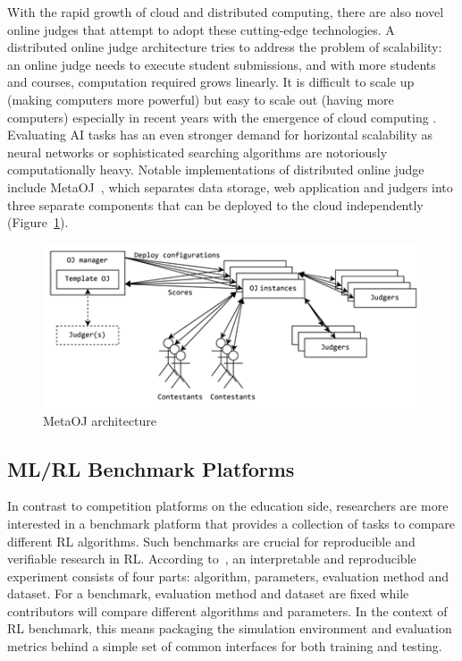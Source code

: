 With the rapid growth of cloud and distributed computing, there are also novel online judges that attempt to adopt these cutting-edge technologies. A distributed online judge architecture tries to address the problem of scalability: an online judge needs to execute student submissions, and with more students and courses, computation required grows linearly. It is difficult to scale up (making computers more powerful) but easy to scale out (having more computers) especially in recent years with the emergence of cloud computing \cite{RN17}. Evaluating AI tasks has an even stronger demand for horizontal scalability as neural networks or sophisticated searching algorithms are notoriously computationally heavy. Notable implementations of distributed online judge include MetaOJ~\cite{metaoj}, which separates data storage, web application and judgers into three separate components that can be deployed to the cloud independently (Figure~\ref{fig:metaoj}).

\begin{figure}[H]
    \centering
    \includegraphics{images/metaoj.png}
    \caption{MetaOJ architecture}
    \label{fig:metaoj}
\end{figure}

\subsection{ML/RL Benchmark Platforms}
In contrast to competition platforms on the education side, researchers are more interested in a benchmark platform that provides a collection of tasks to compare different RL algorithms. Such benchmarks are crucial for reproducible and verifiable research in RL. According to~\cite{RN20}, an interpretable and reproducible experiment consists of four parts: algorithm, parameters, evaluation method and dataset. For a benchmark, evaluation method and dataset are fixed while contributors will compare different algorithms and parameters. In the context of RL benchmark, this means packaging the simulation environment and evaluation metrics behind a simple set of common interfaces for both training and testing.

